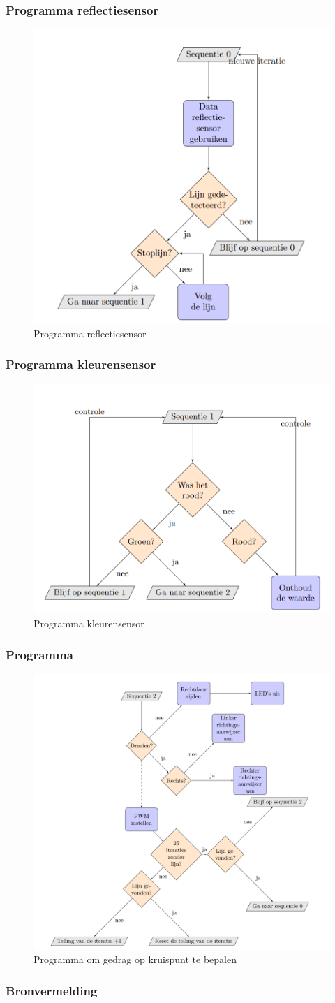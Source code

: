 \documentclass
   [kulak,aspectratio=169,<options>] %
   {kulakbeamer}
\begin{document}
\begin{frame}
	\frametitle{Programma reflectiesensor}
	\begin{figure}
		\centering
		\includegraphics[width=.4\textwidth,]{flowchart_sequentie0}
		\caption{Programma reflectiesensor}
	\end{figure}
\end{frame}

\begin{frame}
	\frametitle{Programma kleurensensor}
	\begin{figure}
		\centering
		\includegraphics[width=.5\textwidth]{flowchart_sequentie1}
		\caption{Programma kleurensensor}
	\end{figure}
\end{frame}

\begin{frame}
	\frametitle{Programma}
	\begin{figure}
		\centering
		\includegraphics[width=.4\textwidth]{flowchart_grootProgramma}
		\caption{Programma om gedrag op kruispunt te bepalen}
	\end{figure}
\end{frame}

\begin{frame}
\frametitle{Bronvermelding}
	
	
	
\end{frame}
\end{document}
